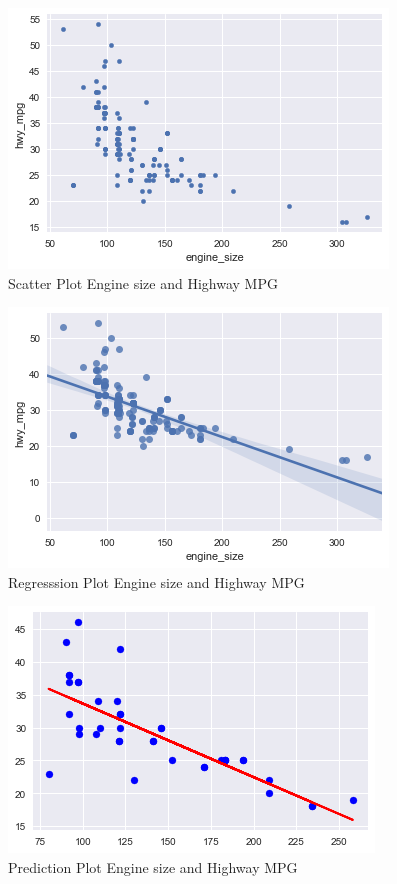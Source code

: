 \begin{figure}[htb]
\includegraphics[width=1.0\columnwidth]{images/scatterplot.png}
  \caption{Scatter Plot Engine size and Highway MPG \cite{}}
  \label{scatterplt}
\end{figure}

\begin{figure}[htb]
\includegraphics[width=1.0\columnwidth]{images/reg_plot.png}
  \caption{Regresssion Plot Engine size and Highway MPG \cite{}}
  \label{regplt}
\end{figure}

\begin{figure}[htb]
\includegraphics[width=1.0\columnwidth]{images/plot_pred_test_set.png}
  \caption{Prediction Plot Engine size and Highway MPG \cite{}}
  \label{regplt}
\end{figure}


 
